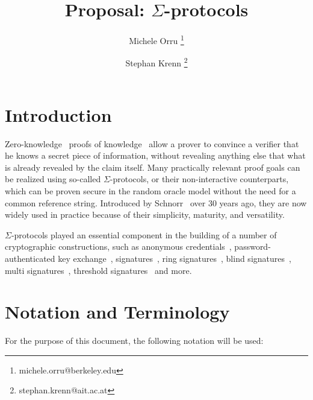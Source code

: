 \documentclass[runningheads,11pt]{article}
\title{Proposal: $\Sigma$-protocols}
\author{Michele Orru \thanks{michele.orru@berkeley.edu} \and Stephan Krenn
\thanks{stephan.krenn@ait.ac.at}
}
\begin{document}
%
\maketitle              %
%
{\hypersetup{hidelinks} \tableofcontents}

\section{Introduction}

Zero-knowledge~\cite{GolMicRac89} proofs of knowledge~\cite{C:BelGol92} allow a prover to convince a verifier that he knows a secret piece of information, without revealing anything else that what is already revealed by the claim itself.
Many practically relevant proof goals can be realized using so-called $\Sigma$-protocols, or their non-interactive counterparts, which can be proven secure in the random oracle model without the need for a common reference string.
Introduced by Schnorr~\cite{JC:Schnorr91} over 30 years ago, they are now widely used  in practice because of their simplicity, maturity, and versatility.

$\Sigma$-protocols played an essential component in the building of a number of cryptographic
constructions,
such as anonymous credentials~\cite{CCS:ChaMeiZav14}, password-authenticated key exchange~\cite{jpake}, signatures~\cite{C:Schnorr89},
ring signatures~\cite{borromeansig}, blind signatures~\cite{CCS:PoiSte97}, multi signatures~\cite{CCS:NRSW20}, threshold signatures~\cite{EPRINT:KomGol20} and more.

\section{Notation and Terminology}
\label{sec:notation}

For the purpose of this document, the following notation will be used:
\end{document}
